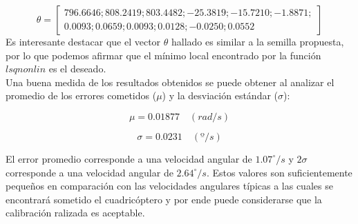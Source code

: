 \documentclass[main]{subfiles}
\begin{document}
\begin{equation}
\theta=\left[\begin{array}{c}
 796.6646; 808.2419; 803.4482; -25.3819; -15.7210; -1.8871; \\
 0.0093; 0.0659; 0.0093; 0.0128; -0.0250; 0.0552  \end{array}\right]
\end{equation}
Es interesante destacar que el vector $\theta$ hallado es similar a la semilla propuesta, por lo que podemos afirmar que el mínimo local encontrado por la función $lsqnonlin$ es el deseado.\\

Una buena medida de los resultados obtenidos se puede obtener al analizar el promedio de los errores cometidos ($\mu$) y la desviación estándar ($\sigma$):

\begin{equation}
\mu=0.01877 \quad (rad/s)
\label{ec:mu_gyro}
\end{equation}

\begin{equation}
\sigma=0.0231 \quad (º/s)
\label{ec:sigma_gyro}
\end{equation}

El error promedio corresponde a una velocidad angular de $1.07^\circ/s$ y $2\sigma$ corresponde a una velocidad angular de $2.64^\circ/s$. Estos valores son suficientemente pequeños en comparaci\'on con las velocidades angulares t\'ipicas a las cuales se encontrar\'a sometido el cuadric\'optero y por ende puede considerarse que la calibraci\'on ralizada es aceptable.
\end{document}

